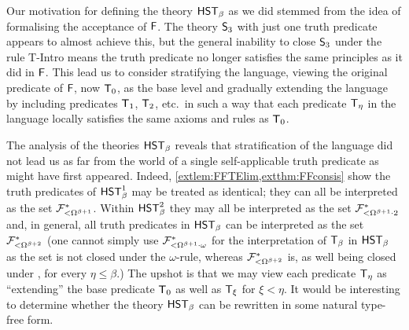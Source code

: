 \documentclass[UKenglish,cleveref,DIV=12]{scrartcl}
\theoremstyle{definition}
\theoremstyle{definition}
\begin{document}
Our motivation for defining the theory $\mathsf{HST}_\beta$ as we did stemmed from the
idea of formalising the acceptance of $\mathsf{F}$. The theory $\mathsf{S}_3$ with just one
truth predicate appears to almost achieve this, but the general inability
to close $\mathsf{S}_3$ under the rule T-Intro means the truth predicate no longer
satisfies the same principles as it did in $\mathsf{F}$. This lead us to consider
stratifying the language, viewing the original predicate of $\mathsf{F}$, now $\mathsf{T}_0$, as
the base level and gradually extending the language by including predicates
$\mathsf{T}_1$, $\mathsf{T}_2$, etc.~in such a way that each predicate $\mathsf{T}_\eta$ in the
language locally satisfies the same axioms and rules as $\mathsf{T}_0$.



The analysis of the theories $\mathsf{HST}_\beta$ reveals that stratification of the
language did not lead us as far from the world of a single self-applicable truth
predicate as might have first appeared. Indeed,
\cref{extlem:FFTElim,extthm:FFconsis} show the truth predicates of $\mathsf{HST}_\beta^1$
may be treated as identical; they can all be interpreted as the set
$\mathcal{F}^*_{<\Omega^{\beta+1}}$. Within $\mathsf{HST}_\beta^2$ they may all be interpreted as the
set $\mathcal{F}^*_{<\Omega^{\beta+1}\cdot2}$ and, in general, all truth predicates in
$\mathsf{HST}_\beta$ can be interpreted as the set
$\mathcal{F}^*_{\mathord<\Omega^{\beta+2}}$ (one cannot simply use
$\mathcal{F}^*_{\mathord<\Omega^{\beta+1}\cdot\omega}$ for the interpretation of $\mathsf{T}_\beta$ in
$\mathsf{HST}_\beta$ as the set is not closed under the $\omega$-rule, whereas
$\mathcal{F}^*_{\mathord<\Omega^{\beta+2}}$ is, as well being closed under \Conec\eta, \Nec\eta for every $\eta\le\beta$.)
The upshot is that we may view each predicate $\mathsf{T}_\eta$ as ``extending'' the base predicate $\mathsf{T}_0$ as well as $\mathsf{T}_\xi$ for $\xi<\eta$. It would be interesting to determine whether the
theory $\mathsf{HST}_\beta$ can be rewritten in some natural type-free form.
\end{document}

